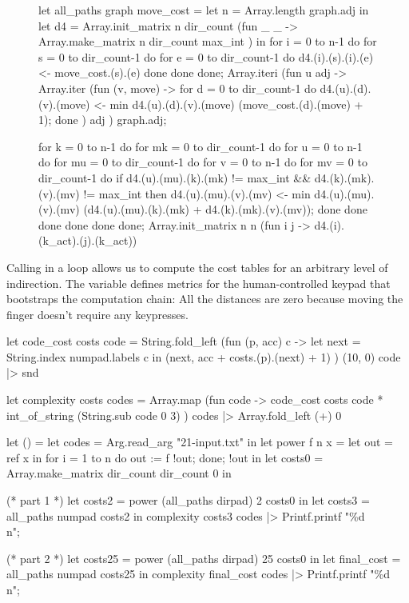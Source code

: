 \documentclass{article}
\begin{document}
\begin{figure}
\begin{code}[ocaml]
let all_paths graph move_cost = 
  let n = Array.length graph.adj in
  let d4 = Array.init_matrix n dir_count (fun _ _ ->
               Array.make_matrix n dir_count max_int
             ) in
  for i = 0 to n-1 do
    for s = 0 to dir_count-1 do
      for e = 0 to dir_count-1 do
        d4.(i).(s).(i).(e) <- move_cost.(s).(e)
      done
    done
  done;
  Array.iteri (fun u adj ->
      Array.iter (fun (v, move) ->
          for d = 0 to dir_count-1 do
            d4.(u).(d).(v).(move) <- min d4.(u).(d).(v).(move)
                                         (move_cost.(d).(move) + 1);
          done
        ) adj
    ) graph.adj;

  for k = 0 to n-1 do
    for mk = 0 to dir_count-1 do
      for u = 0 to n-1 do
        for mu = 0 to dir_count-1 do
          for v = 0 to n-1 do
            for mv = 0 to dir_count-1 do
              if d4.(u).(mu).(k).(mk) != max_int &&
                 d4.(k).(mk).(v).(mv) != max_int then
                d4.(u).(mu).(v).(mv) <-
                  min d4.(u).(mu).(v).(mv)
                      (d4.(u).(mu).(k).(mk) + d4.(k).(mk).(v).(mv));
            done
          done
        done
      done
    done
  done;
  Array.init_matrix n n (fun i j -> d4.(i).(k_act).(j).(k_act))
\end{code}
\end{figure}

Calling  in a loop allows us to compute the cost tables for an arbitrary level of indirection.
The  variable defines metrics for the human-controlled keypad that bootstraps the computation chain:
All the distances are zero because moving the finger doesn't require any keypresses.

\begin{code}[ocaml]
let code_cost costs code =
  String.fold_left (fun (p, acc) c ->
      let next = String.index numpad.labels c in
      (next, acc + costs.(p).(next) + 1)
    ) (10, 0) code |> snd

let complexity costs codes =
  Array.map (fun code ->
      code_cost costs code * int_of_string (String.sub code 0 3)
    ) codes
  |> Array.fold_left (+) 0 

let () =
  let codes = Arg.read_arg "21-input.txt" in
  let power f n x = let out = ref x in for i = 1 to n do out := f !out; done; !out in
  let costs0 = Array.make_matrix dir_count dir_count 0 in

  (* part 1 *)
  let costs2 = power (all_paths dirpad) 2 costs0 in
  let costs3 = all_paths numpad costs2 in
  complexity costs3 codes |> Printf.printf "\%d\\n";

  (* part 2 *)  
  let costs25 = power (all_paths dirpad) 25 costs0 in
  let final_cost = all_paths numpad costs25 in
  complexity final_cost codes |> Printf.printf "\%d\\n";
\end{code}
\end{document}
